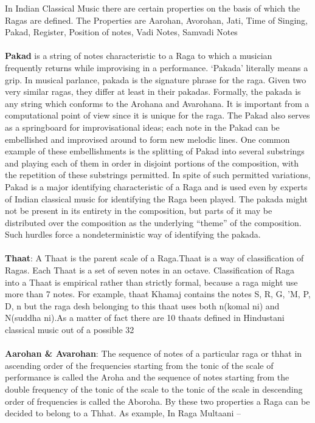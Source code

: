 \documentclass[12pt,a4paper]{article}
\begin{document}
In Indian Classical Music there are certain properties on the basis of which the Ragas are defined. The Properties are Aarohan, Avorohan, Jati, Time of Singing, Pakad, Register, Position of notes, Vadi Notes, Samvadi Notes 
\paragraph{}
{\textbf{Pakad}} is a string of notes characteristic to a Raga to which a musician frequently returns while improvising in a performance. ‘Pakada’ literally means a grip. In musical parlance, pakada is the signature phrase for the raga. Given two very similar ragas, they differ at least in their pakadas. Formally, the pakada is any string which conforms to the Arohana and Avarohana. It is important from a computational point of view since it is unique for the raga. The Pakad also serves as a springboard for improvisational ideas; each note in the Pakad can be embellished and improvised around to form new melodic lines. One common example of these embellishments is the splitting of Pakad into several substrings and playing each of them in order in disjoint portions of the composition, with the repetition of these substrings permitted. In spite of such permitted variations, Pakad is a major identifying characteristic of a Raga and is used even by experts of Indian classical music for identifying the Raga been played. The pakada might not be present in its entirety in the composition, but parts of it may be distributed over the composition as the underlying “theme” of the  composition. Such hurdles force a nondeterministic way of identifying the pakada.
\paragraph{}
{\textbf{Thaat}}: A Thaat is the parent scale of a Raga.Thaat is a way of classification of Ragas. Each Thaat is a set of seven notes in an octave. Classification of Raga into a Thaat is empirical rather than strictly formal, because a raga might use more than 7 notes. For example, thaat Khamaj contains the notes S, R, G, 'M, P, D, n but the raga desh belonging to this thaat uses both n(komal ni) and N(suddha ni).As a matter of fact there are 10 thaats defined in Hindustani classical music out of a possible 32
\paragraph{}		
{\textbf{Aarohan \& Avarohan}}: The sequence of notes of a particular raga or thhat in ascending order of the frequencies starting from the tonic of the scale of performance is called the Aroha and the sequence of notes starting from the double frequency of the tonic of the scale to the tonic of the scale in descending order of frequencies is called the Aboroha. By these two properties a Raga can be decided to belong to a Thhat. As example, In Raga Multaani –\\
					
\end{document}
